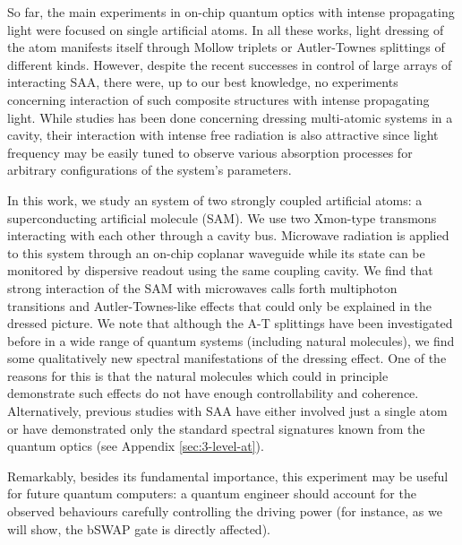 \documentclass[%
 prx,
 amsmath,amssymb,
 reprint,%
]{revtex4-1}
\begin{document}
So far, the main experiments in on-chip quantum optics with intense propagating light were focused on single artificial atoms\cite{baur2009measurement, sillanpaa2009autler, astafiev2010resonance, novikov2013autler, suri2013observation, koshino2013observation, braumuller2015multiphoton, peng2018vacuum, gasparinetti2019two}. In all these works, light dressing of the atom manifests itself through Mollow triplets or Autler-Townes splittings of different kinds. However, despite the recent successes in control of large arrays of interacting SAA\cite{Song574, ye2019propagation, arute2019quantum}, there were, up to our best knowledge, no experiments concerning interaction of such composite structures with intense propagating light. While studies has been done concerning dressing multi-atomic systems in a cavity\cite{fink2009dressed, macha2014implementation, shulga2017observation, yang2018probing}, their interaction with intense free radiation is also attractive since light frequency may be easily tuned to observe various absorption processes for arbitrary configurations of the system's parameters.

In this work, we study an system of two strongly coupled artificial atoms: a superconducting artificial molecule\cite{kou2017fluxonium} (SAM). We use two Xmon-type\cite{barends2013coherent} transmons\cite{koch2007charge} interacting with each other through a cavity bus\cite{majer2007coupling}. Microwave radiation is applied to this system through an on-chip coplanar waveguide while its state can be monitored by dispersive readout using the same coupling cavity\cite{chow2010detecting}. We find that strong interaction of the SAM with microwaves calls forth multiphoton transitions and Autler-Townes-like effects that could only be explained in the dressed picture. We note that although the A-T splittings have been investigated before in a wide range of quantum systems (including natural molecules\cite{tamarat1995pump, ahmed2012autler}), we find some qualitatively new spectral manifestations of the dressing effect. One of the reasons for this is that the natural molecules which could in principle demonstrate such effects do not have enough controllability and coherence. Alternatively, previous studies with SAA have either involved just a single atom or have demonstrated only the standard spectral signatures known from the quantum optics (see Appendix \ref{sec:3-level-at}). 

Remarkably, besides its fundamental importance, this experiment may be useful for future quantum computers: a quantum engineer should account for the observed behaviours carefully controlling the driving power (for instance, as we will show, the bSWAP gate\cite{poletto2012entanglement} is directly affected).
\end{document}
